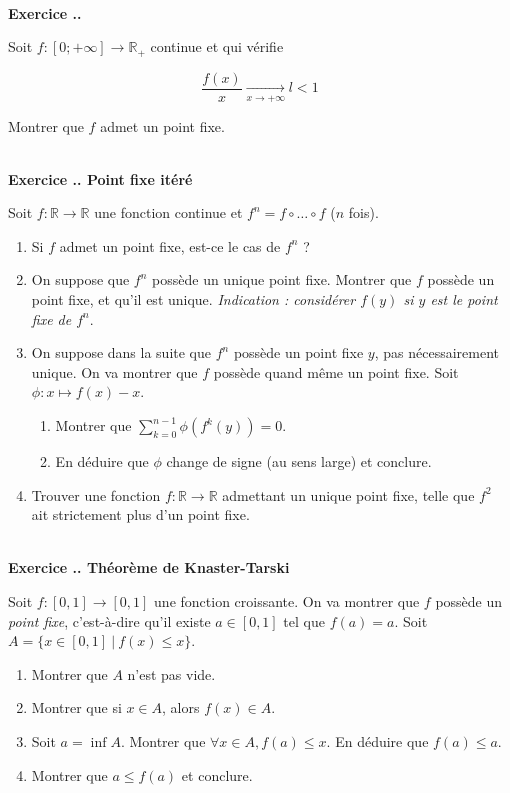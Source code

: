 \documentclass{article}
\newcommand{\mb}[1]{\mathbb{#1}}
\newcounter{exo}
\newcommand{\exercice}[1][\null]{\textbf{\\ Exercice \thesection.\theexo. #1} \addtocounter{exo}{1}}
\begin{document}
\exercice

Soit $f : [0; + \infty] \to \mb{R}_+$ continue et qui vérifie

\begin{equation*}
    \frac{f(x)}{x} \underset{x \to +\infty}{\xrightarrow{\quad\quad\quad}} l < 1
\end{equation*}

Montrer que $f$ admet un point fixe.

\exercice[Point fixe itéré]

Soit $f : \mb{R} \rightarrow \mb{R}$ une fonction continue et $f^n = f \circ \dots \circ f$ ($n$ fois).
\begin{enumerate}

\item Si $f$ admet un point fixe, est-ce le cas de $f^n$ ?

\item On suppose que $f^n$ possède un unique point fixe. Montrer que $f$ possède un point fixe, et qu'il est unique. \emph{Indication : considérer $f(y)$ si $y$ est le point fixe de $f^n$}.

\item On suppose dans la suite que $f^n$ possède un point fixe $y$, pas nécessairement unique. On va montrer que $f$ possède quand même un point fixe. Soit $\phi : x \mapsto f(x) -x$.

\begin{enumerate}

\item Montrer que $\displaystyle \sum_{k=0}^{n-1} \phi(f^k(y)) = 0$.

\item En déduire que $\phi$ change de signe (au sens large) et conclure.

\end{enumerate}

\item Trouver une fonction $f : \mb{R} \rightarrow \mb{R}$ admettant un unique point fixe, telle que $f^2$ ait strictement plus d'un point fixe.


\end{enumerate}


\exercice[Théorème de Knaster-Tarski]

Soit $f : [0,1] \rightarrow [0,1]$ une fonction croissante. On va montrer que $f$ possède un \emph{point fixe}, c'est-à-dire qu'il existe $a \in [0,1]$ tel que $f(a) = a$. Soit $A = \{x \in [0,1]~|~f(x)\le x\}$.

\begin{enumerate}

\item Montrer que $A$ n'est pas vide.

\item Montrer que si $x \in A$, alors $f(x) \in A$.

\item Soit $a = \inf A$. Montrer que $\forall x \in A, f(a) \le x$. En déduire que $f(a)\le a$.

\item Montrer que $a \le f(a)$ et conclure.

\end{enumerate}
\end{document}
